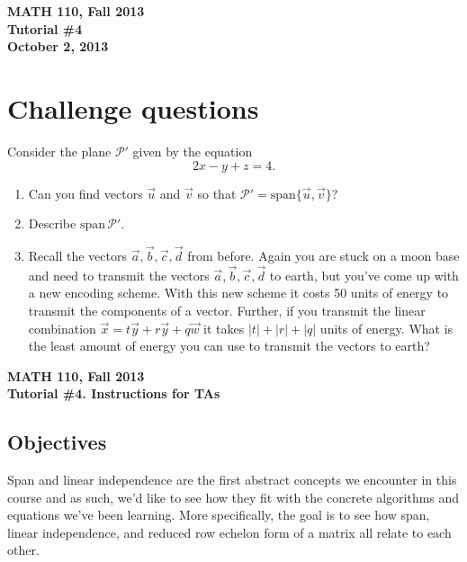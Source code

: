 \documentclass[11pt]{exam}
\renewcommand{\span}{\mathrm{span}}
\newcommand{\mthCourse}{MATH 110}
\newcommand{\mthTerm}{Fall 2013}
\newcommand{\mthTutorialNumber}{4}
\newcommand{\mthDate}{October 2, 2013}
\begin{document}
\newpage
{
	\begin{center}
		{\bf \mthCourse, \mthTerm}\\ 
		{\bf Tutorial \#\mthTutorialNumber}\\
		{\bf \mthDate}
	\end{center}
}

\section*{Challenge questions}
	Consider the plane $\mathcal P'$ given by the equation
	\[
		2x-y+z=4.
	\]
\begin{enumerate}[resume]
	\item Can you find
	vectors $\vec u$ and $\vec v$ so that $\mathcal{P}'=\span\{\vec u,\vec v\}$?
	\item Describe $\span \, \mathcal P'$.
	
	\item Recall the vectors $\vec a,\vec b,\vec c,\vec d$ from before.  
	Again you are stuck on a moon base and need to transmit the vectors
	$\vec a,\vec b,\vec c,\vec d$ to earth, but you've come up with a new
	encoding scheme.  With this new scheme it costs 50 units of energy
	to transmit the components of a vector.  Further, if you transmit
	the linear combination $\vec x=t\vec y+r\vec y+q\vec w$ it
	takes $|t|+|r|+|q|$ units of energy.  What is the least amount of energy
	you can use to transmit the vectors to earth?
\end{enumerate}



\newpage
{\small
	\begin{center}
		{\bf \mthCourse, \mthTerm}\\ 
		{\bf Tutorial \#\mthTutorialNumber. Instructions for TAs}
	\end{center}
}

\subsection*{Objectives}

	Span and linear independence are the first abstract concepts 
	we encounter in this course and as such, we'd like to see
	how they fit with the concrete algorithms and equations
	we've been learning.  More specifically, the goal is to see
	how span, linear independence, and reduced row echelon form
	of a matrix all relate to each other.
\end{document}
